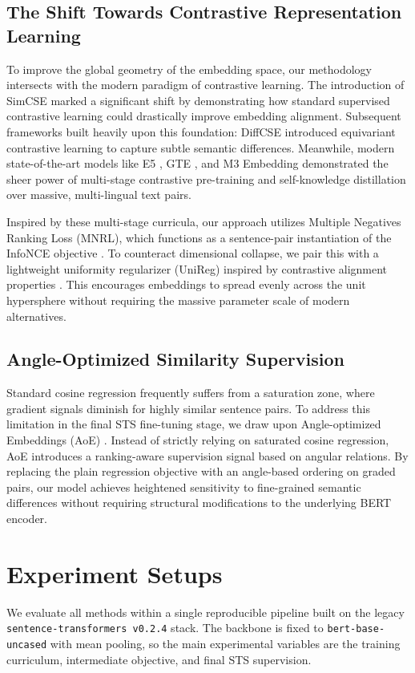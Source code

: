 \documentclass[letterpaper]{article} %
\begin{document}
\subsection{The Shift Towards Contrastive Representation Learning}
To improve the global geometry of the embedding space, our methodology intersects with the modern paradigm of contrastive learning. 
The introduction of SimCSE \cite{gao-etal-2021-simcse} marked a significant shift by demonstrating how standard supervised contrastive learning could drastically improve embedding alignment. 
Subsequent frameworks built heavily upon this foundation: DiffCSE \cite{chuang-etal-2022-diffcse} introduced equivariant contrastive learning to capture subtle semantic differences. 
Meanwhile, modern state-of-the-art models like E5 \cite{wang-etal-2022-e5}, GTE \cite{li-etal-2023-gte}, and M3 Embedding \cite{chen2024bge} demonstrated the sheer power of multi-stage contrastive pre-training and self-knowledge distillation over massive, multi-lingual text pairs. 

Inspired by these multi-stage curricula, our approach utilizes Multiple Negatives Ranking Loss (MNRL), which functions as a sentence-pair instantiation of the InfoNCE objective \cite{rusak2025infonce}. 
To counteract dimensional collapse, we pair this with a lightweight uniformity regularizer (UniReg) inspired by contrastive alignment properties \cite{wang-isola-2020-alignment-uniformity}. 
This encourages embeddings to spread evenly across the unit hypersphere without requiring the massive parameter scale of modern alternatives.

\subsection{Angle-Optimized Similarity Supervision}
Standard cosine regression frequently suffers from a saturation zone, where gradient signals diminish for highly similar sentence pairs. To address this limitation in the final STS fine-tuning stage, we draw upon Angle-optimized Embeddings (AoE) \cite{li-li-2024-aoe}. 
Instead of strictly relying on saturated cosine regression, AoE introduces a ranking-aware supervision signal based on angular relations. By replacing the plain regression objective with an angle-based ordering on graded pairs, our model achieves heightened sensitivity to fine-grained semantic differences without requiring structural modifications to the underlying BERT encoder.

\section{Experiment Setups}
We evaluate all methods within a single reproducible pipeline built on the legacy
\texttt{sentence-transformers v0.2.4} stack. The backbone is fixed to
\texttt{bert-base-uncased} with mean pooling, so the main experimental variables are the training
curriculum, intermediate objective, and final STS supervision.
\end{document}
